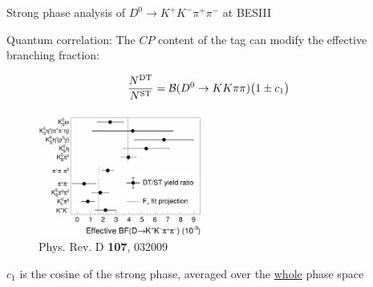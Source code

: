 \documentclass{beamer}
\begin{document}
\begin{frame}{Strong phase analysis of $D^0\to K^+K^-\pi^+\pi^-$ at BESIII}
  \begin{center}
    Quantum correlation: The $C\!P$ content of the tag can modify the effective branching fraction:
  \end{center}
  \begin{equation*}
    \frac{N^{\rm DT}}{N^{\rm ST}} = \mathcal{B}(D^0\to KK\pi\pi)\big(1\pm c_1\big)
  \end{equation*}
  \begin{figure}
    \includegraphics[width = 0.50\textwidth]{Plots/CPeven_fraction_combination_CPtags.png}
    \caption*{\tiny Phys. Rev. D \textbf{107}, 032009}
  \end{figure}
  \vspace{-0.5cm}
  \begin{center}
    $c_1$ is the cosine of the strong phase, averaged over the \underline{whole} phase space
  \end{center}
\end{frame}
\end{document}
